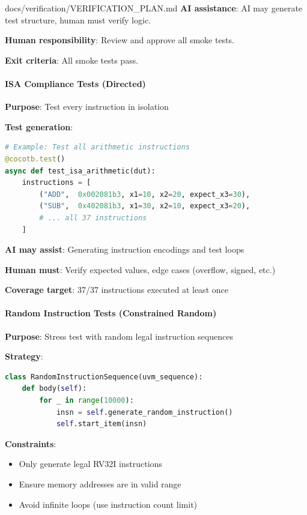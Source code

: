 \begin{relocated}{docs/verification/VERIFICATION_PLAN.md}
\textbf{AI assistance}: AI may generate test structure, human must
verify logic.

\textbf{Human responsibility}: Review and approve all smoke tests.

\textbf{Exit criteria}: All smoke tests pass.

\paragraph{ISA Compliance Tests (Directed)}\label{ds:ch:verification-plan:2-isa-compliance-tests-directed}

\textbf{Purpose}: Test every instruction in isolation

\textbf{Test generation}:

\begin{lstlisting}[language=Python]
# Example: Test all arithmetic instructions
@cocotb.test()
async def test_isa_arithmetic(dut):
    instructions = [
        ("ADD",  0x002081b3, x1=10, x2=20, expect_x3=30),
        ("SUB",  0x402081b3, x1=30, x2=10, expect_x3=20),
        # ... all 37 instructions
    ]
\end{lstlisting}

\textbf{AI may assist}: Generating instruction encodings and test loops

\textbf{Human must}: Verify expected values, edge cases (overflow,
signed, etc.)

\textbf{Coverage target}: 37/37 instructions executed at least once

\paragraph{Random Instruction Tests (Constrained Random)}\label{ds:ch:verification-plan:3-random-instruction-tests-constrained-random}

\textbf{Purpose}: Stress test with random legal instruction sequences

\textbf{Strategy}:

\begin{lstlisting}[language=Python]
class RandomInstructionSequence(uvm_sequence):
    def body(self):
        for _ in range(10000):
            insn = self.generate_random_instruction()
            self.start_item(insn)
\end{lstlisting}

\textbf{Constraints}:

\begin{itemize}
\tightlist
\item
  Only generate legal RV32I instructions
\item
  Ensure memory addresses are in valid range
\item
  Avoid infinite loops (use instruction count limit)
\end{itemize}


\end{relocated}
